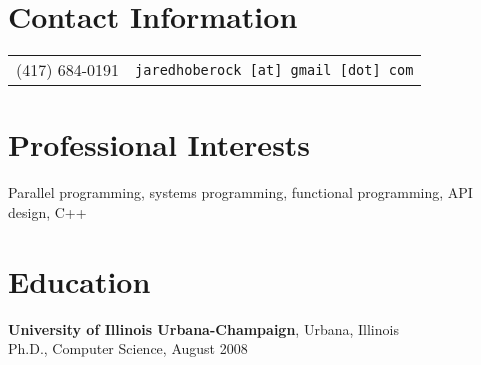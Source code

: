 \documentclass[margin,line]{res}
\newenvironment{list1}{
  \begin{list}{\ding{113}}{%
      \setlength{\itemsep}{0in}
      \setlength{\parsep}{0in} \setlength{\parskip}{0in}
      \setlength{\topsep}{0in} \setlength{\partopsep}{0in}
      \setlength{\leftmargin}{0.17in}}}{\end{list}}
\newenvironment{list2}{
  \begin{list}{$\bullet$}{%
      \setlength{\itemsep}{0in}
      \setlength{\parsep}{0in} \setlength{\parskip}{0in}
      \setlength{\topsep}{0in} \setlength{\partopsep}{0in}
      \setlength{\leftmargin}{0.2in}}}{\end{list}}
\begin{document}
\vspace*{-1.75cm}

\begin{resume}
\section{\sc Contact Information}
\vspace{.05in}


\begin{tabular}{@{}l|l}
(417) 684-0191 & \texttt{jaredhoberock [at] gmail [dot] com} \\
\end{tabular}

\section{\sc Professional Interests}
Parallel programming, systems programming, functional programming, API design, C++

\section{\sc Education}
{\bf University of Illinois Urbana-Champaign}, Urbana, Illinois\\
Ph.D., Computer Science, August 2008


\end{resume}
\end{document}

